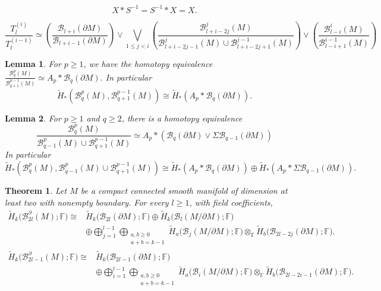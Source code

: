 \documentclass[10pt,a4paper]{amsart}
\newtheorem{thm}{Theorem}
\newtheorem{lem}{Lemma}
\newcommand{\BB}{\mathcal B}
\newcommand{\pa}{\partial}
\newcommand{\wt}{\widetilde}
\begin{document}
\begin{equation}\label{convention}
X*S^{-1}=S^{-1}*X=X.
\end{equation}

\begin{equation}\label{eq:Ti-quotient-general} \frac{T_l^{(i)}}{T_l^{(i-1)}}\simeq\left(\frac{\BB_{l+i}(\pa M)}{\BB_{l+i-1}(\pa M)}\right)
\vee\bigvee_{1\le j<i}
\left(
\frac{\BB_{l+i-2j}^{j}(M)}
{\BB_{l+i-2j-1}^{j}(M)\cup\BB_{l+i-2j+1}^{j-1}(M)}
\right)
\vee\left(
\frac{\BB_{l-i}^{i}(M)}{\BB_{l-i+1}^{i-1}(M)}
\right)
\end{equation}

\begin{lem}\label{lem:row-quotient-splitting}
For $p\geq 1$, we have the homotopy equivalence 
$\displaystyle\frac{\BB_q^p(M)}{\BB_{q+1}^{p-1}(M)} 
\simeq 
A_p*\BB_q(\pa M)$.
In particular
$$\displaystyle 
\wt H_*\left(\BB_q^p(M), \BB_{q+1}^{p-1}(M)\right)
\cong
\wt H_*(A_p*\BB_q(\pa M)).
$$
\end{lem} 

\begin{lem}\label{eq:two-sided-mixed-quotient}
For \(p\ge1\) and \(q\ge2\), there is a homotopy equivalence
$$\frac{\BB_q^p(M)}{\BB_{q-1}^{p}(M)\cup\BB_{q+1}^{p-1}(M)}\simeq
A_p*(\BB_q(\pa M)\vee\Sigma \BB_{q-1}(\pa M))
$$
In particular
$$\displaystyle 
\wt H_*\left(
\BB_q^p(M), \BB_{q-1}^{p}(M)\cup\BB_{q+1}^{p-1}(M)
\right) \cong
\wt H_*(A_p*\BB_q(\pa M))
\oplus
\wt H_*(A_p*\Sigma \BB_{q-1}(\pa M)).$$
\end{lem}

\begin{thm}\label{thm:intro-general-homology}
Let \(M\) be a compact connected smooth manifold of dimension at least two with nonempty boundary.  For every \(l\ge1\), with field coefficients,
\begin{equation}\label{eq:intro-general-even}
\begin{aligned}
\widetilde H_k\bigl(\BB_{2l}^{\partial}(M);\mathbb F\bigr)
\cong {}&
\widetilde H_k\bigl(\BB_{2l}(\partial M);\mathbb F\bigr)
\oplus
\widetilde H_k\bigl(\BB_l(M/\partial M);\mathbb F\bigr)
\\
&\oplus
\bigoplus_{j=1}^{l-1}
\bigoplus_{\substack{a,b\ge0\\a+b=k-1}}
\widetilde H_a\bigl(\BB_j(M/\partial M);\mathbb F\bigr)
\otimes_{\mathbb F}
\widetilde H_b\bigl(\BB_{2l-2j}(\partial M);\mathbb F\bigr).
\end{aligned}
\end{equation}
\begin{equation}\label{eq:intro-general-odd}
\begin{aligned}
\widetilde H_k\bigl(\BB_{2l-1}^{\partial}(M);\mathbb F\bigr)
\cong {}&
\widetilde H_k\bigl(\BB_{2l-1}(\partial M);\mathbb F\bigr)
\\
&\oplus
\bigoplus_{i=1}^{l-1}
\bigoplus_{\substack{a,b\ge0\\a+b=k-1}}
\widetilde H_a\bigl(\BB_i(M/\partial M);\mathbb F\bigr)
\otimes_{\mathbb F}
\widetilde H_b\bigl(\BB_{2l-2i-1}(\partial M);\mathbb F\bigr).
\end{aligned}
\end{equation}
\end{thm}
\end{document}
